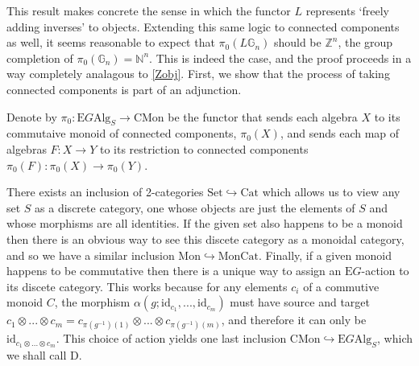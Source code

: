 This result makes concrete the sense in which the functor $L$ represents `freely adding inverses' to objects. Extending this same logic to connected components as well, it seems reasonable to expect that $\pi_0(L\mathbb{G}_n)$ should be $\mathbb{Z}^n$, the group completion of $\pi_0(\mathbb{G}_n) = \mathbb{N}^n$. This is indeed the case, and the proof proceeds in a way completely analagous to \cref{Zobj}. First, we show that the process of taking connected components is part of an adjunction.

\begin{defn} Denote by $\pi_0: \mathrm{E}G\mathrm{Alg}_S \to \mathrm{CMon}$ be the functor that sends each algebra $X$ to its commutaive monoid of connected components, $\pi_0(X)$, and sends each map of algebras $F: X \to Y$ to its restriction to connected components $\pi_0(F): \pi_0(X) \to \pi_0(Y)$.\end{defn}

\begin{defn} There exists an inclusion of 2-categories $\mathrm{Set} \hookrightarrow \mathrm{Cat}$ which allows us to view any set $S$ as a discrete category, one whose objects are just the elements of $S$ and whose morphisms are all identities. If the given set also happens to be a monoid then there is an obvious way to see this discete category as a monoidal category, and so we have a similar inclusion $\mathrm{Mon} \hookrightarrow \mathrm{MonCat}$. Finally, if a given monoid happens to be commutative then there is a unique way to assign an $\mathrm{E}G$-action to its discete category. This works because for any elements $c_i$ of a commutive monoid $C$, the morphism $\alpha(g; \mathrm{id}_{c_1}, ..., \mathrm{id}_{c_m})$ must have source and target $c_1 \otimes ... \otimes c_m = c_{\pi(g^{-1})(1)} \otimes ... \otimes c_{\pi(g^{-1})(m)}$, and therefore it can only be $\mathrm{id}_{c_1 \otimes ... \otimes c_m}$. This choice of action yields one last inclusion $\mathrm{CMon} \hookrightarrow \mathrm{E}G\mathrm{Alg}_S$, which we shall call $\mathrm{D}$. \end{defn}

